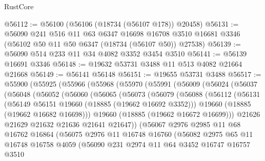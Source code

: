 \begin{lexlean}{RustCore}
\begin{coremodule}
@56112 := @56100 (@56106 (@18734 (@56107 @178)) @20458)
@56131 := @56090
    @241
    @516
    @11
    @63
    @6347
    @16698
    @16708
    @3510
    @16681
    @3346
    (@56102 @50 @11 @50 @6347 (@18734 (@56107 @50)) @27538)
@56139 := @56090 @514 @233 @11 @34 @4082 @3352 @3454 @3510
@56141 := @56139 @16691 @3346
@56148 := @19632 @53731 @3488 @11 @513 @4082 @21664 @21668
@56149 := @56141 @56148
@56151 := @19655 @53731 @3488
@56517 := @55900
    (@55925
      (@55966
        (@55968
          (@55970
            (@55991
              (@56009
                (@56024
                  (@56037
                    (@56048
                      (@56052
                        (@56060
                          (@56065
                            (@56073
                              (@56079
                                (@56088
                                  (@56112
                                    (@56131
                                      (@56149 @56151 @19660 (@18885 (@19662 @16692 @3352)))
                                      @19660
                                      (@18885 (@19662 @16682 @16698)))
                                    @19660
                                    (@18885 (@19662 @16672 @16699)))
                                  @21626
                                  @21629
                                  @21632
                                  @21636
                                  @21641
                                  @21647))
                              (@56067
                                @2976
                                @2985
                                @11
                                @68
                                @16762
                                @16864
                                (@56075
                                  @2976
                                  @11
                                  @16748
                                  @16760
                                  (@56082
                                    @2975
                                    @65
                                    @11
                                    @16748
                                    @16758
                                    @4059
                                    (@56090
                                      @231
                                      @2974
                                      @11
                                      @64
                                      @3452
                                      @16747
                                      @16757
                                      @3510

\end{coremodule}
\end{lexlean}
